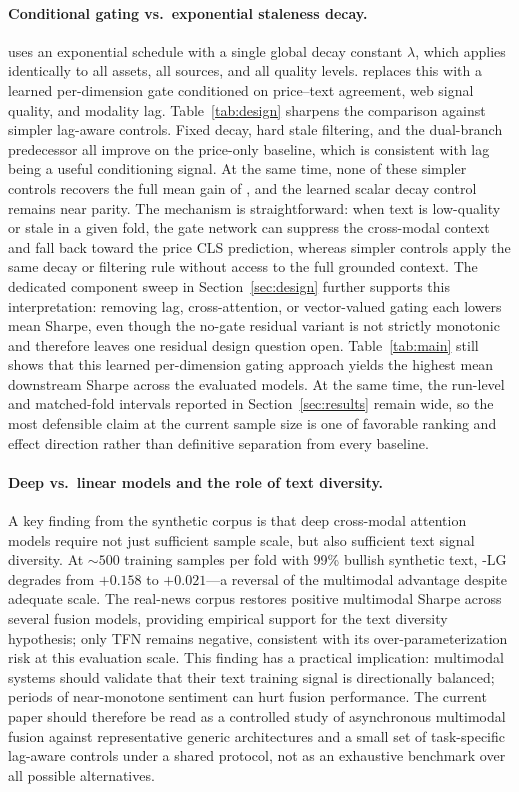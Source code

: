 \paragraph{Conditional gating vs.\ exponential staleness decay.}
\SACMA{} uses an exponential schedule with a single global decay constant $\lambda$, which applies identically to all assets, all sources, and all quality levels.
\CGCMA{} replaces this with a learned per-dimension gate conditioned on price--text agreement, web signal quality, and modality lag.
Table~\ref{tab:design} sharpens the comparison against simpler lag-aware controls.
Fixed decay, hard stale filtering, and the dual-branch predecessor all improve on the price-only baseline, which is consistent with lag being a useful conditioning signal.
At the same time, none of these simpler controls recovers the full mean gain of \CGCMA{}, and the learned scalar decay control remains near parity.
The mechanism is straightforward: when text is low-quality or stale in a given fold, the gate network can suppress the cross-modal context and fall back toward the price CLS prediction, whereas simpler controls apply the same decay or filtering rule without access to the full grounded context.
The dedicated component sweep in Section~\ref{sec:design} further supports this interpretation: removing lag, cross-attention, or vector-valued gating each lowers mean Sharpe, even though the no-gate residual variant is not strictly monotonic and therefore leaves one residual design question open.
Table~\ref{tab:main} still shows that this learned per-dimension gating approach yields the highest mean downstream Sharpe across the evaluated models.
At the same time, the run-level and matched-fold intervals reported in Section~\ref{sec:results} remain wide, so the most defensible claim at the current sample size is one of favorable ranking and effect direction rather than definitive separation from every baseline.

\paragraph{Deep vs.\ linear models and the role of text diversity.}
A key finding from the synthetic corpus is that deep cross-modal attention models require not just sufficient sample scale, but also sufficient text signal diversity.
At ${\sim}500$ training samples per fold with 99\% bullish synthetic text, \SACMA{}-LG degrades from $+0.158$ to $+0.021$---a reversal of the multimodal advantage despite adequate scale.
The real-news corpus restores positive multimodal Sharpe across several fusion models, providing empirical support for the text diversity hypothesis; only \textsc{TFN} remains negative, consistent with its over-parameterization risk at this evaluation scale.
This finding has a practical implication: multimodal systems should validate that their text training signal is directionally balanced; periods of near-monotone sentiment can hurt fusion performance.
The current paper should therefore be read as a controlled study of asynchronous multimodal fusion against representative generic architectures and a small set of task-specific lag-aware controls under a shared protocol, not as an exhaustive benchmark over all possible alternatives.
